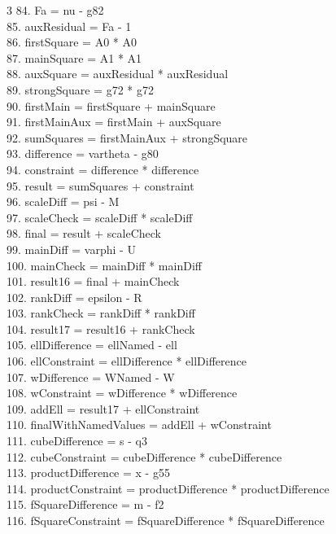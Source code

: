 \documentclass[10pt]{article}
\begin{document}
\begin{multicols}{3}
84. Fa = nu - g82\\
85. auxResidual = Fa - 1\\
86. firstSquare = A0 * A0\\
87. mainSquare = A1 * A1\\
88. auxSquare = auxResidual * auxResidual\\
89. strongSquare = g72 * g72\\
90. firstMain = firstSquare + mainSquare\\
91. firstMainAux = firstMain + auxSquare\\
92. sumSquares = firstMainAux + strongSquare\\
93. difference = vartheta - g80\\
94. constraint = difference * difference\\
95. result = sumSquares + constraint\\
96. scaleDiff = psi - M\\
97. scaleCheck = scaleDiff * scaleDiff\\
98. final = result + scaleCheck\\
99. mainDiff = varphi - U\\
100. mainCheck = mainDiff * mainDiff\\
101. result16 = final + mainCheck\\
102. rankDiff = epsilon - R\\
103. rankCheck = rankDiff * rankDiff\\
104. result17 = result16 + rankCheck\\
105. ellDifference = ellNamed - ell\\
106. ellConstraint = ellDifference * ellDifference\\
107. wDifference = WNamed - W\\
108. wConstraint = wDifference * wDifference\\
109. addEll = result17 + ellConstraint\\
110. finalWithNamedValues = addEll + wConstraint\\
111. cubeDifference = s - q3\\
112. cubeConstraint = cubeDifference * cubeDifference\\
113. productDifference = x - g55\\
114. productConstraint = productDifference * productDifference\\
115. fSquareDifference = m - f2\\
116. fSquareConstraint = fSquareDifference * fSquareDifference\\

\end{multicols}
\end{document}
